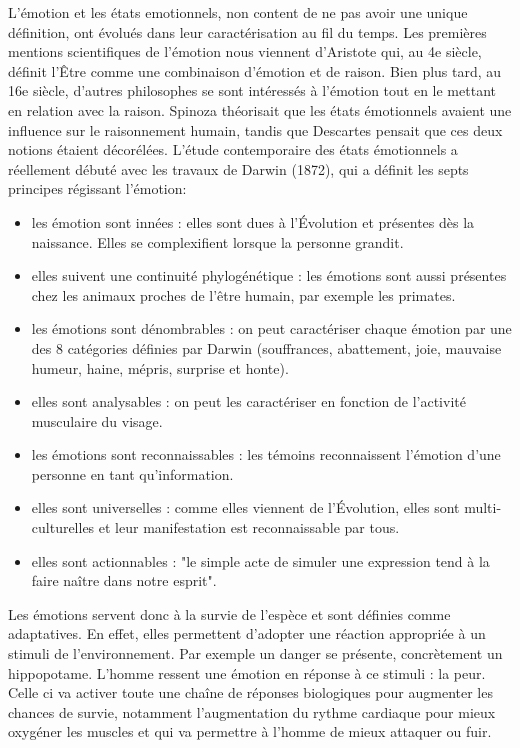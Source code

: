 L'émotion et les états emotionnels, non content de ne pas avoir une unique définition, ont évolués dans leur caractérisation au fil du temps. Les premières mentions scientifiques de l'émotion nous viennent d'Aristote qui, au 4e siècle, définit l'Être comme une combinaison d'émotion et de raison. Bien plus tard, au 16e siècle, d'autres philosophes se sont intéressés à l'émotion tout en le mettant en relation avec la raison. Spinoza théorisait que les états émotionnels avaient une influence sur le raisonnement humain, tandis que Descartes pensait que ces deux notions étaient décorélées.
L'étude contemporaire des états émotionnels a réellement débuté avec les travaux de Darwin (1872), qui a définit les septs principes régissant l'émotion:
\begin{itemize}
    \item les émotion sont innées : elles sont dues à l'Évolution et présentes dès la naissance. Elles se complexifient lorsque la personne grandit.
    \item elles suivent une continuité phylogénétique : les émotions sont aussi présentes chez les animaux proches de l'être humain, par exemple les primates.
    \item les émotions sont dénombrables : on peut caractériser chaque émotion par une des 8 catégories définies par Darwin (souffrances, abattement, joie, mauvaise humeur, haine, mépris, surprise et honte).
    \item elles sont analysables : on peut les caractériser en fonction de l'activité musculaire du visage.
    \item les émotions sont reconnaissables : les témoins reconnaissent l'émotion d'une personne en tant qu'information.
    \item elles sont universelles : comme elles viennent de l'Évolution, elles sont multi-culturelles et leur manifestation est reconnaissable par tous.
    \item elles sont actionnables : "le simple acte de simuler une expression tend à la faire naître dans notre esprit".
\end{itemize}
Les émotions servent donc à la survie de l’espèce et sont définies comme adaptatives. En effet, elles permettent d'adopter une réaction appropriée à un stimuli de l'environnement. Par exemple un danger se présente, concrètement un hippopotame. L'homme ressent une émotion en réponse à ce stimuli : la peur. Celle ci va activer toute une chaîne de réponses biologiques pour augmenter les chances de survie, notamment l'augmentation du rythme cardiaque pour mieux oxygéner les muscles et qui va permettre à l'homme de mieux attaquer ou fuir. \\
